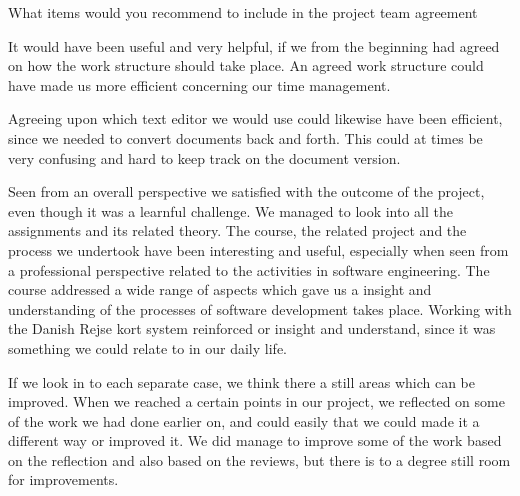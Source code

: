 What items would you recommend to include in the project team agreement


It would have been useful and very helpful, if we from the beginning had agreed on how the work structure should take place. An agreed work structure could have made us more efficient concerning our time management.

Agreeing upon which text editor we would use could likewise have been efficient, since we needed to convert documents back and forth. This could at times be very confusing and hard to keep track on the document version.


Seen from an overall perspective we satisfied with the outcome of the project, even though it was a learnful challenge. We managed to look into all the assignments and its related theory. The course, the related project and the process we undertook have been interesting and useful, especially when seen from a professional perspective related to the activities in software engineering. The course addressed a wide range of aspects which gave us a insight and understanding of the processes of software development takes place. Working with the Danish Rejse kort system reinforced or insight and understand, since it was something we could relate to in our daily life.


If we look in to each separate case, we think there a still areas which can be improved. When we reached a certain points in our project, we reflected on some of the work we had done earlier on, and could easily that we could made it a different way or improved it. We did manage to improve some of the work based on the reflection and also based on the reviews, but there is to a degree still room for improvements.
